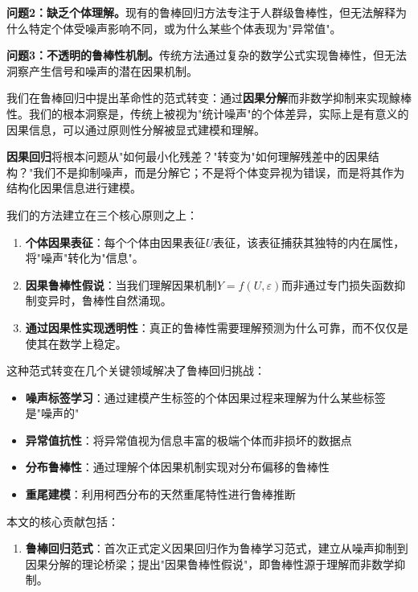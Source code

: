 \documentclass[conference]{IEEEtran}
\begin{document}
\begin{CJK}{UTF8}{gbsn}
\textbf{问题2：缺乏个体理解。}现有的鲁棒回归方法专注于人群级鲁棒性，但无法解释为什么特定个体受噪声影响不同，或为什么某些个体表现为"异常值"。

\textbf{问题3：不透明的鲁棒性机制。}传统方法通过复杂的数学公式实现鲁棒性，但无法洞察产生信号和噪声的潜在因果机制。

我们在鲁棒回归中提出革命性的范式转变：通过\textbf{因果分解}而非数学抑制来实现鰁棒性。我们的根本洞察是，传统上被视为"统计噪声"的个体差异，实际上是有意义的因果信息，可以通过原则性分解被显式建模和理解。

\textbf{因果回归}将根本问题从"如何最小化残差？"转变为"如何理解残差中的因果结构？"我们不是抑制噪声，而是分解它；不是将个体变异视为错误，而是将其作为结构化因果信息进行建模。

我们的方法建立在三个核心原则之上：

\begin{enumerate}
\item \textbf{个体因果表征}：每个个体由因果表征$U$表征，该表征捕获其独特的内在属性，将"噪声"转化为"信息"。

\item \textbf{因果鲁棒性假说}：当我们理解因果机制$Y = f(U, \varepsilon)$而非通过专门损失函数抑制变异时，鲁棒性自然涌现。

\item \textbf{通过因果性实现透明性}：真正的鲁棒性需要理解预测为什么可靠，而不仅仅是使其在数学上稳定。
\end{enumerate}

这种范式转变在几个关键领域解决了鲁棒回归挑战：

\begin{itemize}
\item \textbf{噪声标签学习}：通过建模产生标签的个体因果过程来理解为什么某些标签是"噪声的"
\item \textbf{异常值抗性}：将异常值视为信息丰富的极端个体而非损坏的数据点
\item \textbf{分布鲁棒性}：通过理解个体因果机制实现对分布偏移的鲁棒性
\item \textbf{重尾建模}：利用柯西分布的天然重尾特性进行鲁棒推断
\end{itemize}

本文的核心贡献包括：

\begin{enumerate}
\item \textbf{鲁棒回归范式}：首次正式定义因果回归作为鲁棒学习范式，建立从噪声抑制到因果分解的理论桥梁；提出"因果鲁棒性假说"，即鲁棒性源于理解而非数学抑制。


\end{enumerate}
\end{CJK}
\end{document}
